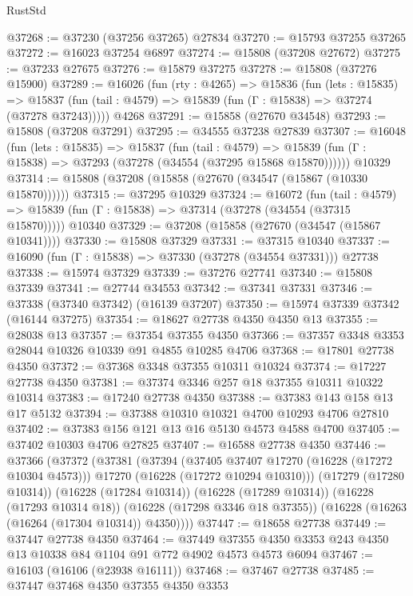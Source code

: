 \begin{lexlean}{RustStd}
\begin{coremodule}
@37268 := @37230 (@37256 @37265) @27834
@37270 := @15793 @37255 @37265
@37272 := @16023 @37254 @6897
@37274 := @15808 (@37208 @27672)
@37275 := @37233 @27675
@37276 := @15879 @37275
@37278 := @15808 (@37276 @15900)
@37289 := @16026
    (fun (rty : @4265) =>
    @15836
      (fun (lets : @15835) =>
      @15837 (fun (tail : @4579) => @15839 (fun (Γ : @15838) => @37274 (@37278 @37243)))))
    @4268
@37291 := @15858 (@27670 @34548)
@37293 := @15808 (@37208 @37291)
@37295 := @34555 @37238 @27839
@37307 := @16048
    (fun (lets : @15835) =>
    @15837
      (fun (tail : @4579) =>
      @15839 (fun (Γ : @15838) => @37293 (@37278 (@34554 (@37295 @15868 @15870))))))
    @10329
@37314 := @15808 (@37208 (@15858 (@27670 (@34547 (@15867 (@10330 @15870))))))
@37315 := @37295 @10329
@37324 := @16072
    (fun (tail : @4579) => @15839 (fun (Γ : @15838) => @37314 (@37278 (@34554 (@37315 @15870)))))
    @10340
@37329 := @37208 (@15858 (@27670 (@34547 (@15867 @10341))))
@37330 := @15808 @37329
@37331 := @37315 @10340
@37337 := @16090 (fun (Γ : @15838) => @37330 (@37278 (@34554 @37331))) @27738
@37338 := @15974 @37329
@37339 := @37276 @27741
@37340 := @15808 @37339
@37341 := @27744 @34553
@37342 := @37341 @37331
@37346 := @37338 (@37340 @37342) (@16139 @37207)
@37350 := @15974 @37339 @37342 (@16144 @37275)
@37354 := @18627 @27738 @4350 @4350 @13
@37355 := @28038 @13
@37357 := @37354 @37355 @4350
@37366 := @37357 @3348 @3353 @28044 @10326 @10339 @91 @4855 @10285 @4706
@37368 := @17801 @27738 @4350
@37372 := @37368 @3348 @37355 @10311 @10324
@37374 := @17227 @27738 @4350
@37381 := @37374 @3346 @257 @18 @37355 @10311 @10322 @10314
@37383 := @17240 @27738 @4350
@37388 := @37383 @143 @158 @13 @17 @5132
@37394 := @37388 @10310 @10321 @4700 @10293 @4706 @27810
@37402 := @37383 @156 @121 @13 @16 @5130 @4573 @4588 @4700
@37405 := @37402 @10303 @4706 @27825
@37407 := @16588 @27738 @4350
@37446 := @37366
    (@37372
      (@37381
        (@37394
          (@37405 @37407 @17270 (@16228 (@17272 @10304 @4573)))
          @17270
          (@16228 (@17272 @10294 @10310)))
        (@17279 (@17280 @10314))
        (@16228 (@17284 @10314))
        (@16228 (@17289 @10314))
        (@16228 (@17293 @10314 @18))
        (@16228 (@17298 @3346 @18 @37355))
        (@16228 (@16263 (@16264 (@17304 @10314)) @4350))))
@37447 := @18658 @27738
@37449 := @37447 @27738 @4350
@37464 := @37449 @37355 @4350 @3353 @243 @4350 @13 @10338 @84 @1104 @91 @772 @4902 @4573 @4573 @6094
@37467 := @16103 (@16106 (@23938 @16111))
@37468 := @37467 @27738
@37485 := @37447
    @37468
    @4350
    @37355
    @4350
    @3353

\end{coremodule}
\end{lexlean}
